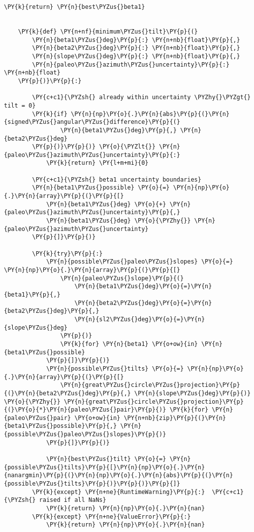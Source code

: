 \begin{tcolorbox}[breakable, size=fbox, boxrule=1pt, pad at break*=1mm,colback=cellbackground, colframe=cellborder]
\begin{Verbatim}[commandchars=\\\{\}]
        \PY{k}{return} \PY{n}{best\PYZus{}beta1}
    
    
    \PY{k}{def} \PY{n+nf}{minimum\PYZus{}tilt}\PY{p}{(}
        \PY{n}{beta1\PYZus{}deg}\PY{p}{:} \PY{n+nb}{float}\PY{p}{,}
        \PY{n}{beta2\PYZus{}deg}\PY{p}{:} \PY{n+nb}{float}\PY{p}{,}
        \PY{n}{slope\PYZus{}deg}\PY{p}{:} \PY{n+nb}{float}\PY{p}{,}
        \PY{n}{paleo\PYZus{}azimuth\PYZus{}uncertainty}\PY{p}{:} \PY{n+nb}{float}
    \PY{p}{)}\PY{p}{:}
    
        \PY{c+c1}{\PYZsh{} already within uncertainty \PYZhy{}\PYZgt{} tilt = 0}
        \PY{k}{if} \PY{n}{np}\PY{o}{.}\PY{n}{abs}\PY{p}{(}\PY{n}{signed\PYZus{}angular\PYZus{}difference}\PY{p}{(}
                \PY{n}{beta1\PYZus{}deg}\PY{p}{,} \PY{n}{beta2\PYZus{}deg}
        \PY{p}{)}\PY{p}{)} \PY{o}{\PYZlt{}} \PY{n}{paleo\PYZus{}azimuth\PYZus{}uncertainty}\PY{p}{:}
            \PY{k}{return} \PY{l+m+mi}{0}
    
        \PY{c+c1}{\PYZsh{} beta1 uncertainty boundaries}
        \PY{n}{beta1\PYZus{}possible} \PY{o}{=} \PY{n}{np}\PY{o}{.}\PY{n}{array}\PY{p}{(}\PY{p}{[}
            \PY{n}{beta1\PYZus{}deg} \PY{o}{+} \PY{n}{paleo\PYZus{}azimuth\PYZus{}uncertainty}\PY{p}{,}
            \PY{n}{beta1\PYZus{}deg} \PY{o}{\PYZhy{}} \PY{n}{paleo\PYZus{}azimuth\PYZus{}uncertainty}
        \PY{p}{]}\PY{p}{)}
    
        \PY{k}{try}\PY{p}{:}
            \PY{n}{possible\PYZus{}paleo\PYZus{}slopes} \PY{o}{=} \PY{n}{np}\PY{o}{.}\PY{n}{array}\PY{p}{(}\PY{p}{[}
                \PY{n}{paleo\PYZus{}slope}\PY{p}{(}
                    \PY{n}{beta1\PYZus{}deg}\PY{o}{=}\PY{n}{beta1}\PY{p}{,}
                    \PY{n}{beta2\PYZus{}deg}\PY{o}{=}\PY{n}{beta2\PYZus{}deg}\PY{p}{,}
                    \PY{n}{sl2\PYZus{}deg}\PY{o}{=}\PY{n}{slope\PYZus{}deg}
                \PY{p}{)}
                \PY{k}{for} \PY{n}{beta1} \PY{o+ow}{in} \PY{n}{beta1\PYZus{}possible}
            \PY{p}{]}\PY{p}{)}
            \PY{n}{possible\PYZus{}tilts} \PY{o}{=} \PY{n}{np}\PY{o}{.}\PY{n}{array}\PY{p}{(}\PY{p}{[}
                \PY{n}{great\PYZus{}circle\PYZus{}projection}\PY{p}{(}\PY{n}{beta2\PYZus{}deg}\PY{p}{,} \PY{n}{slope\PYZus{}deg}\PY{p}{)} \PY{o}{\PYZhy{}} \PY{n}{great\PYZus{}circle\PYZus{}projection}\PY{p}{(}\PY{o}{*}\PY{n}{paleo\PYZus{}pair}\PY{p}{)} \PY{k}{for} \PY{n}{paleo\PYZus{}pair} \PY{o+ow}{in} \PY{n+nb}{zip}\PY{p}{(}\PY{n}{beta1\PYZus{}possible}\PY{p}{,} \PY{n}{possible\PYZus{}paleo\PYZus{}slopes}\PY{p}{)}
            \PY{p}{]}\PY{p}{)}
    
            \PY{n}{best\PYZus{}tilt} \PY{o}{=} \PY{n}{possible\PYZus{}tilts}\PY{p}{[}\PY{n}{np}\PY{o}{.}\PY{n}{nanargmin}\PY{p}{(}\PY{n}{np}\PY{o}{.}\PY{n}{abs}\PY{p}{(}\PY{n}{possible\PYZus{}tilts}\PY{p}{)}\PY{p}{)}\PY{p}{]}
        \PY{k}{except} \PY{n+ne}{RuntimeWarning}\PY{p}{:}  \PY{c+c1}{\PYZsh{} raised if all NaNs}
            \PY{k}{return} \PY{n}{np}\PY{o}{.}\PY{n}{nan}
        \PY{k}{except} \PY{n+ne}{ValueError}\PY{p}{:}
            \PY{k}{return} \PY{n}{np}\PY{o}{.}\PY{n}{nan}
    

\end{Verbatim}
\end{tcolorbox}
